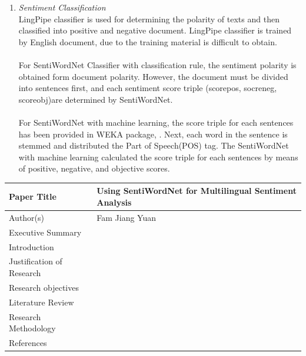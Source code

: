 \documentclass[a4papaer.12pt]{article}
\begin{document}
\begin{enumerate}[I]
\item \textit{Sentiment Classification}
\\
LingPipe classifier is used for determining the polarity of texts and then classified  into positive and negative document. LingPipe classifier is trained by English document, due to the training material is difficult to obtain.
\\
\\
For SentiWordNet Classifier with classification rule, the sentiment polarity is obtained form document polarity. However, the document must be divided into sentences first, and each sentiment score triple (score{\tiny pos}, socre{\tiny neg}, score{\tiny obj})are determined by SentiWordNet.
\\
\\
For SentiWordNet with machine learning, the score triple for each sentences has been provided in WEKA package, \cite{esuli2006sentiwordnet}. Next, each word in the sentence is stemmed and distributed the Part of Speech(POS) tag. The SentiWordNet with machine learning calculated the score triple for each sentences by means of positive, negative, and objective scores.
\end{enumerate}

\pagebreak




\pagebreak

\begin{center}
\begin{tabular}{|m{5cm} | m{10cm} |}
\hline
Paper Title & Using SentiWordNet for Multilingual Sentiment Analysis\\ \hline
Author(s) & Fam Jiang Yuan\\ \hline
Executive Summary & \\ \hline 
Introduction & \\ \hline
Justification of Research & \\ \hline
Research objectives & \\ \hline
Literature Review & \\ \hline
Research Methodology & \\ \hline
References & \\ \hline 
\end{tabular}
\end{center}
\end{document}
